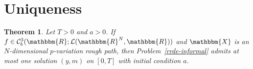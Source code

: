 \documentclass[11pt,reqno,oneside]{amsart}
\numberwithin{equation}{section}
\newtheorem{lemma}{Lemma}
\newtheorem{theorem}{Theorem}
\newcommand{\R}{{\mathbb R}}
\begin{document}
%

\section{Uniqueness}\label{sec:uniqueness}

\begin{theorem}\label{thm:uniqueness}
Let $T>0$ and $a>0$. If $f\in \mathcal{C}_b^3(\mathbbm{R};\mathcal{L}(\mathbbm{R}^N,\mathbbm{R}))$ and $\mathbbm{X}$ is an $N$-dimensional $p$-variation rough path, then Problem~\eqref{rrde-informal} admits at most one solution $(y,m)$ on $[0,T]$ with initial condition $a$.
\end{theorem}
\end{document}
